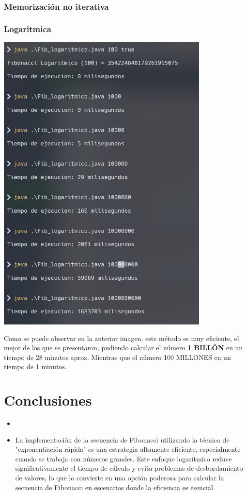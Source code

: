 \documentclass{article}
\begin{document}
            \subsubsection{Memorización no iterativa}
            
            \subsubsection{Logaritmica}
            \begin{center}
                \includegraphics[width=0.8\textwidth]{img/tmp_logaritmica.png}
            \end{center}
            Como se puede observar en la anterior imagen, este método es muy eficiente, el mejor de los que se presentaron, pudiendo calcular el número \textbf{1 BILLÓN} en un tiempo de 28 minutos aprox. Mientras que el número 100 MILLONES en un tiempo de 1 minutos. 


    \section{Conclusiones}
        \begin{itemize}
            \item {}
            \item {La implementación de la secuencia de Fibonacci utilizando la técnica de "exponentiación rápida" es una estrategia altamente eficiente, especialmente cuando se trabaja con números grandes. Este enfoque logarítmico reduce significativamente el tiempo de cálculo y evita problemas de desbordamiento de valores, lo que lo convierte en una opción poderosa para calcular la secuencia de Fibonacci en escenarios donde la eficiencia es esencial.}
        \end{itemize}
        
\end{document}
